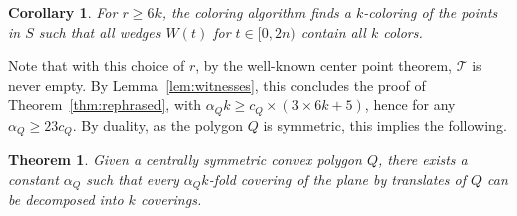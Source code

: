 \documentclass[english,11pt]{article}
\newtheorem{theorem}{Theorem}
\newtheorem{corollary}{Corollary}
\newcommand{\bigt}{\mathcal T}
\begin{document}
\begin{corollary}
For $r\geq 6k$, the coloring algorithm finds a $k$-coloring of the points in $S$ such that all wedges $W(t)$ for $t\in [0,2n)$ contain all $k$ colors.
\end{corollary}

Note that with this choice of $r$, by the well-known center point theorem, $\bigt$  is never empty. By Lemma~\ref{lem:witnesses}, this concludes the proof of Theorem~\ref{thm:rephrased}, with $\alpha_Q k \geq c_Q \times (3 \times 6k {+} 5)$, hence for any $\alpha_Q \geq 23 c_Q$. By duality, as the polygon $Q$ is symmetric, this implies the following.

\begin{theorem}
\label{thm:main}
Given a centrally symmetric convex polygon $Q$, there exists a constant $\alpha_Q$ such that every $\alpha_Q k$-fold covering of the plane by translates of $Q$ can be decomposed into $k$ coverings.
\end{theorem}



\end{document}

